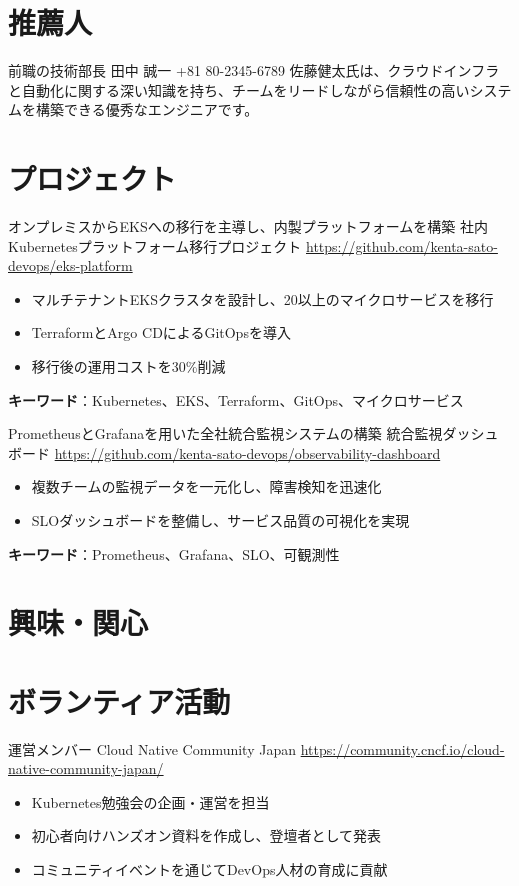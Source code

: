 \documentclass[a4paper, serif, 10pt]{moderncv}
\begin{document}
\section{推薦人}

        {前職の技術部長}
        {田中 誠一}
        {+81 80-2345-6789}
        {}
        {佐藤健太氏は、クラウドインフラと自動化に関する深い知識を持ち、チームをリードしながら信頼性の高いシステムを構築できる優秀なエンジニアです。}
\section{プロジェクト}

        {オンプレミスからEKSへの移行を主導し、内製プラットフォームを構築}
        {社内Kubernetesプラットフォーム移行プロジェクト}
        {\url{https://github.com/kenta-sato-devops/eks-platform}}
        {}
        {\begin{itemize}
\item マルチテナントEKSクラスタを設計し、20以上のマイクロサービスを移行
\item TerraformとArgo CDによるGitOpsを導入
\item 移行後の運用コストを30\%削減
\end{itemize}
\textbf{キーワード}：Kubernetes、EKS、Terraform、GitOps、マイクロサービス}

        {PrometheusとGrafanaを用いた全社統合監視システムの構築}
        {統合監視ダッシュボード}
        {\url{https://github.com/kenta-sato-devops/observability-dashboard}}
        {}
        {\begin{itemize}
\item 複数チームの監視データを一元化し、障害検知を迅速化
\item SLOダッシュボードを整備し、サービス品質の可視化を実現
\end{itemize}
\textbf{キーワード}：Prometheus、Grafana、SLO、可観測性}
\section{興味・関心}

\section{ボランティア活動}

        {運営メンバー}
        {Cloud Native Community Japan}
        {\url{https://community.cncf.io/cloud-native-community-japan/}}
        {}
        {\begin{itemize}
\item Kubernetes勉強会の企画・運営を担当
\item 初心者向けハンズオン資料を作成し、登壇者として発表
\item コミュニティイベントを通じてDevOps人材の育成に貢献
\end{itemize}}
    
\end{document}
